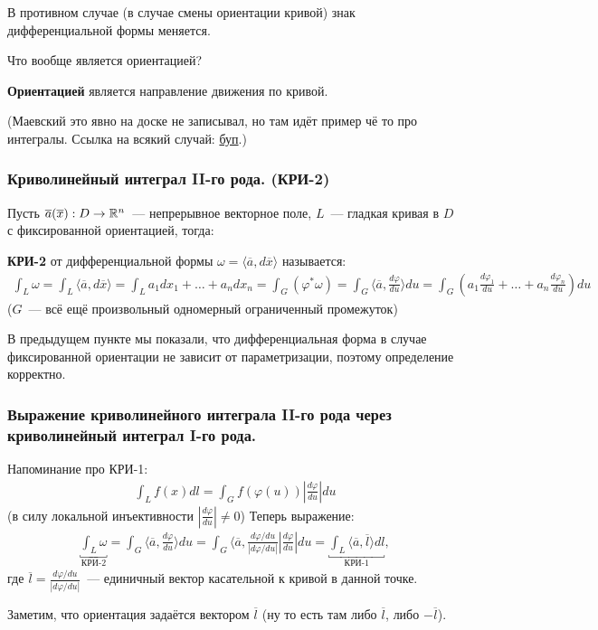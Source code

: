 В противном случае (в случае смены ориентации кривой) знак дифференциальной формы меняется.

Что вообще является ориентацией?

\begin{definition*}
    \textbf{Ориентацией} является направление движения по кривой.
\end{definition*}
(Маевский это явно на доске не записывал, но там идёт пример чё то про интегралы. Ссылка на всякий случай: \href{https://youtu.be/WS-N2Dka3xU?list=PLEwK9wdS5g0qV-430pfXzTawd6pI_VUgq&t=2905}{буп}.)

\subsubsection{Криволинейный интеграл II-го рода. (КРИ-2)}
Пусть $\overline{a}(\overline{x}) : D \to \mathbb{R}^n$~--- непрерывное векторное поле, $L$~--- гладкая кривая в $D$ с фиксированной ориентацией, тогда:
\begin{definition*}
    \textbf{КРИ-2} от дифференциальной формы $\omega = \langle \overline{a}, d\overline{x} \rangle$ называется:
    \begin{align*}
        \displaystyle
        \int_L \omega = \int_L \langle \overline{a}, d\overline{x} \rangle = \int_L a_1 dx_1 + \ldots + a_n dx_n = \int_G (\varphi^* \omega) = \int_G \langle \overline{a}, \frac{d\varphi}{du} \rangle du = \int_G (a_1 \frac{d\varphi_1}{du} + \ldots + a_n \frac{d\varphi_n}{du})du
    \end{align*}
    ($G$~--- всё ещё произвольный одномерный ограниченный промежуток)
\end{definition*}
В предыдущем пункте мы показали, что дифференциальная форма в случае фиксированной ориентации не зависит от параметризации, поэтому определение корректно.

\subsubsection{Выражение криволинейного интеграла II-го рода через криволинейный интеграл I-го рода.}
Напоминание про КРИ-1:
\begin{align*}
    \int_L f(x) dl = \int_G f(\varphi(u)) \left\lvert \frac{d\varphi}{du} \right\rvert du
\end{align*}
(в силу локальной инъективности $\left\lvert \frac{d\varphi}{du} \right\rvert \neq 0$)
Теперь выражение:
\begin{align*}
    \underbracket{\int_L \omega}_{\text{КРИ-2}} = \int_G \langle \overline{a}, \frac{d\varphi}{du} \rangle du = \int_G \langle \overline{a}, \frac{d\varphi/du}{\left\lvert d\varphi/du \right\rvert} \left\lvert \frac{d\varphi}{du} \right\rvert du = \underbracket{\int_L \langle \overline{a}, \overline{l} \rangle dl}_{\text{КРИ-1}},
\end{align*}
где $\overline{l} = \frac{d\varphi/du}{\left\lvert d\varphi/du \right\rvert}$~--- единичный вектор касательной к кривой в данной точке. 

Заметим, что ориентация задаётся вектором $\overline{l}$ (ну то есть там либо $\overline{l}$, либо $-\overline{l}$).
